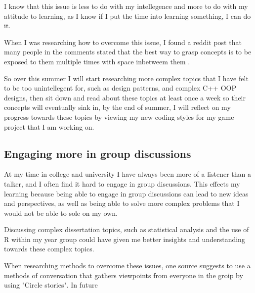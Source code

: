 \documentclass{scrartcl}
\begin{document}
I know that this issue is less to do with my intellegence and more to do with my attitude to learning, as I know if I put the time into learning something, I can do it.

When I was researching how to overcome this issue, I found a reddit post that many people in the comments stated that the best way to grasp concepts is to be exposed to them multiple times with space inbetweem them \cite{Reddit}.

So over this summer I will start researching more complex topics that I have felt to be too unintellegent for, such as design patterns, and complex C++ OOP designs, then sit down and read about these topics at least once a week so their concepts will eventually sink in, by the end of summer, I will reflect on my progress towards these topics by viewing my new coding styles for my game project that I am working on.



\subsection{Engaging more  in group discussions}

At my time in college and university I have always been more of a listener than a talker, and I often find it hard to engage in group discussions. This effects my learning because being able to engage in group discussions can lead to new ideas and perspectives, as well as being able to solve more complex problems that I would not be able to sole on my own.

Discussing complex dissertation topics, such as statistical analysis and the use of R within my year group could have given me better insights and understanding towards these complex topics.


When researching methods to overcome these issues, one source \cite{Group} suggests to use a methods of conversation that gathers viewpoints from everyone in the groip by using "Circle stories".
In future

\par






\end{document}
